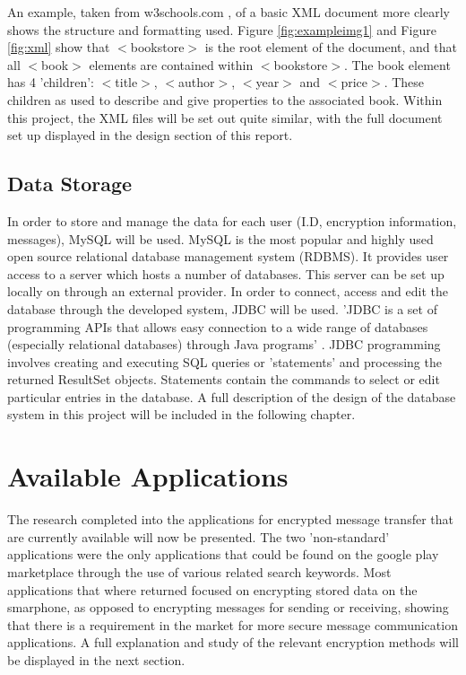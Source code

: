 \documentclass[a4paper,10pt]{report}
\begin{document}
An example, taken from w3schools.com \cite{w3schoolsxmlexample}, of a basic XML document more clearly shows the structure and formatting used. Figure \ref{fig:exampleimg1} and Figure \ref{fig:xml} show that $<$bookstore$>$ is the root element of the document, and that all $<$book$>$ elements are contained within $<$bookstore$>$. The book element has 4 'children': $<$title$>$, $<$author$>$, $<$year$>$ and $<$price$>$. These children as used to describe and give properties to the associated book. Within this project, the XML files will be set out quite similar, with the full document set up displayed in the design section of this report. 

\subsection{Data Storage}

In order to store and manage the data for each user (I.D, encryption information, messages), MySQL \cite{mysql} will be used. MySQL is the most popular and highly used open source relational database management system (RDBMS). It provides user access to a server which hosts a number of databases. This server can be set up locally on through an external provider. In order to connect, access and edit the database through the developed system, JDBC will be used. 'JDBC is a set of programming APIs that allows easy connection to a wide range of databases (especially relational databases) through Java programs' \cite{jdbcmysql}. JDBC programming involves creating and executing SQL queries or 'statements' and processing the returned ResultSet objects. Statements contain the commands to select or edit particular entries in the database. A full description of the design of the database system in this project will be included in the following chapter. 

\section{Available Applications}

The research completed into the applications for encrypted message transfer that are currently available will now be presented. The two 'non-standard' applications were the only applications that could be found on the google play marketplace \cite{googleplay} through the use of various related search keywords. Most applications that where returned focused on encrypting stored data on the smarphone, as opposed to encrypting messages for sending or receiving, showing that there is a requirement in the market for more secure message communication applications. A full explanation and study of the relevant encryption methods will be displayed in the next section.
\end{document}
